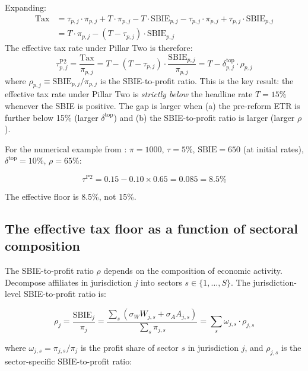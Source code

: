 \documentclass[11pt,a4paper]{article}
\begin{document}
Expanding:
\begin{align}
\text{Tax} &= \tau_{p,j} \cdot \pi_{p,j} + T \cdot \pi_{p,j} - T \cdot \text{SBIE}_{p,j} - \tau_{p,j} \cdot \pi_{p,j} + \tau_{p,j} \cdot \text{SBIE}_{p,j} \nonumber \\
&= T \cdot \pi_{p,j} - (T - \tau_{p,j}) \cdot \text{SBIE}_{p,j} \label{eq:total_tax_simplified}
\end{align}
The effective tax rate under Pillar Two is therefore:
\begin{equation}\label{eq:etr_pillar2}
\tau_{p,j}^{\text{P2}} = \frac{\text{Tax}}{\pi_{p,j}} = T - (T - \tau_{p,j}) \cdot \frac{\text{SBIE}_{p,j}}{\pi_{p,j}} = T - \delta_{p,j}^{\text{top}} \cdot \rho_{p,j}
\end{equation}
where $\rho_{p,j} \equiv \text{SBIE}_{p,j} / \pi_{p,j}$ is the SBIE-to-profit ratio. This is the key result: the effective tax rate under Pillar Two is \emph{strictly below} the headline rate $T = 15\%$ whenever the SBIE is positive. The gap is larger when (a) the pre-reform ETR is further below 15\% (larger $\delta^{\text{top}}$) and (b) the SBIE-to-profit ratio is larger (larger $\rho$).

For the numerical example from \citet{schjelderup2024}: $\pi = 1000$, $\tau = 5\%$, $\text{SBIE} = 650$ (at initial rates), $\delta^{\text{top}} = 10\%$, $\rho = 65\%$:

\[
\tau^{\text{P2}} = 0.15 - 0.10 \times 0.65 = 0.085 = 8.5\%
\]

The effective floor is 8.5\%, not 15\%.

\subsection{The effective tax floor as a function of sectoral composition}\label{sec:floor}

The SBIE-to-profit ratio $\rho$ depends on the composition of economic activity. Decompose affiliates in jurisdiction $j$ into sectors $s \in \{1, \ldots, S\}$. The jurisdiction-level SBIE-to-profit ratio is:

\begin{equation}\label{eq:rho_sectoral}
\rho_j = \frac{\text{SBIE}_j}{\pi_j} = \frac{\sum_s \left(\sigma_W W_{j,s} + \sigma_A A_{j,s}\right)}{\sum_s \pi_{j,s}} = \sum_s \omega_{j,s} \cdot \rho_{j,s}
\end{equation}

where $\omega_{j,s} = \pi_{j,s} / \pi_j$ is the profit share of sector $s$ in jurisdiction $j$, and $\rho_{j,s}$ is the sector-specific SBIE-to-profit ratio:
\end{document}
